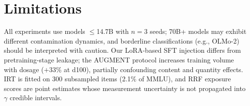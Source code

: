 \section*{Limitations}
\label{sec:limitations}

All experiments use models $\leq$14.7B with $n\!=\!3$ seeds; 70B+ models may exhibit different contamination dynamics, and borderline classifications (e.g., OLMo-2) should be interpreted with caution. Our LoRA-based SFT injection differs from pretraining-stage leakage; the AUGMENT protocol increases training volume with dosage ($+$33\% at d100), partially confounding content and quantity effects. IRT is fitted on 300 subsampled items (2.1\% of MMLU), and RRF exposure scores are point estimates whose measurement uncertainty is not propagated into $\gamma$ credible intervals.
